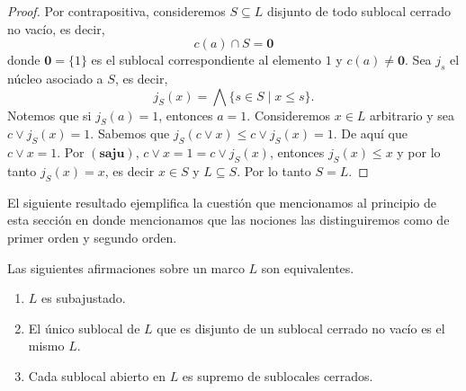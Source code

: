 \documentclass{comunicaciones}
\begin{document}
\begin{proof}
    Por contrapositiva, consideremos $S\subseteq L$ disjunto de todo sublocal cerrado no vacío, es decir, 
    \[c(a)\cap S=\mathbf{0}\]
    donde $\mathbf{0}=\{1\}$ es el sublocal correspondiente al elemento $1$ y $c(a)\neq \mathbf{0}$. Sea $j_s$ el núcleo asociado a $S$, es decir,
    \[
    j_S(x)=\bigwedge\{s\in S\mid x\leq s\}.
    \]
    Notemos que si $j_S(a)=1$, entonces $a=1$. Consideremos $x\in L$ arbitrario y sea $c\vee j_S(x)=1$. Sabemos que $j_S(c\vee x)\leq c\vee j_S(x)=1$. De aquí que $c\vee x=1$. Por $(\mathbf{saju})$, $c\vee x=1=c\vee j_S(x)$, entonces $j_S(x)\leq x$ y por lo tanto $j_S(x)=x$, es decir $x\in S$ y $L\subseteq S$. Por lo tanto $S=L$. 
\end{proof}

El siguiente resultado ejemplifica la cuestión que mencionamos al principio de esta sección en donde mencionamos que las nociones las distinguiremos como de primer orden y segundo orden.

\begin{thm}\label{Saju2orden}
    Las siguientes afirmaciones sobre un marco $L$ son equivalentes.
    \begin{enumerate}
        \item $L$ es subajustado.
        \item El único sublocal de $L$ que es disjunto de un sublocal cerrado no vacío es el mismo $L$.
        \item Cada sublocal abierto en $L$ es supremo de sublocales cerrados.
    \end{enumerate}
\end{thm}
\end{document}

